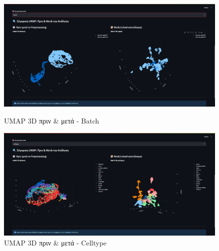 \begin{figure}[!htb]
  \centering
  \begin{minipage}[t]{0.46\textwidth}
    \centering
    \includegraphics[width=\textwidth]{images/Analysis_Results4.png}
    \caption*{\small \foreignlanguage{english}{UMAP 3D} πριν \& μετά - \foreignlanguage{english}{Batch}}
  \end{minipage}
  \hfill
  \begin{minipage}[t]{0.46\textwidth}
    \centering
    \includegraphics[width=\textwidth]{images/Analysis_Results5.png}
    \caption*{\small \foreignlanguage{english}{UMAP 3D} πριν \& μετά - \foreignlanguage{english}{Celltype}}
  \end{minipage}
\end{figure}

